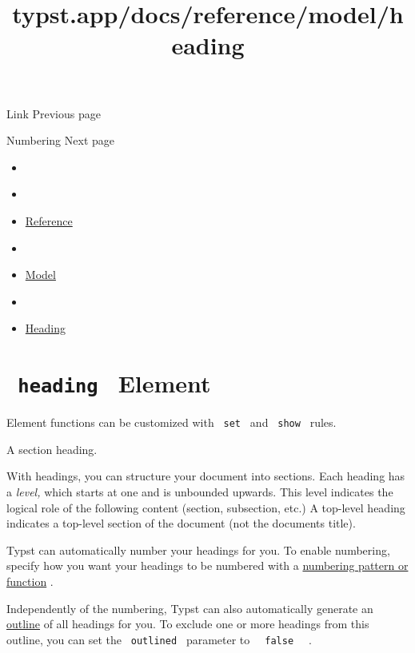 { Link } { Previous page }

\href{/docs/reference/model/numbering/}{\pandocbounded{}}

{ Numbering } { Next page }


\title{typst.app/docs/reference/model/heading}

\begin{itemize}
\tightlist
\item
  \href{/docs}{}
\item
  
\item
  \href{/docs/reference/}{Reference}
\item
  
\item
  \href{/docs/reference/model/}{Model}
\item
  
\item
  \href{/docs/reference/model/heading/}{Heading}
\end{itemize}

\section{\texorpdfstring{\texttt{\ heading\ } {{ Element
}}}{ heading   Element }}\label{summary}

\label{element-tooltip}
Element functions can be customized with \texttt{\ set\ } and
\texttt{\ show\ } rules.

A section heading.

With headings, you can structure your document into sections. Each
heading has a \emph{level,} which starts at one and is unbounded
upwards. This level indicates the logical role of the following content
(section, subsection, etc.) A top-level heading indicates a top-level
section of the document (not the document\textquotesingle s title).

Typst can automatically number your headings for you. To enable
numbering, specify how you want your headings to be numbered with a
\href{/docs/reference/model/numbering/}{numbering pattern or function} .

Independently of the numbering, Typst can also automatically generate an
\href{/docs/reference/model/outline/}{outline} of all headings for you.
To exclude one or more headings from this outline, you can set the
\texttt{\ outlined\ } parameter to
\texttt{\ }{\texttt{\ false\ }}\texttt{\ } .

